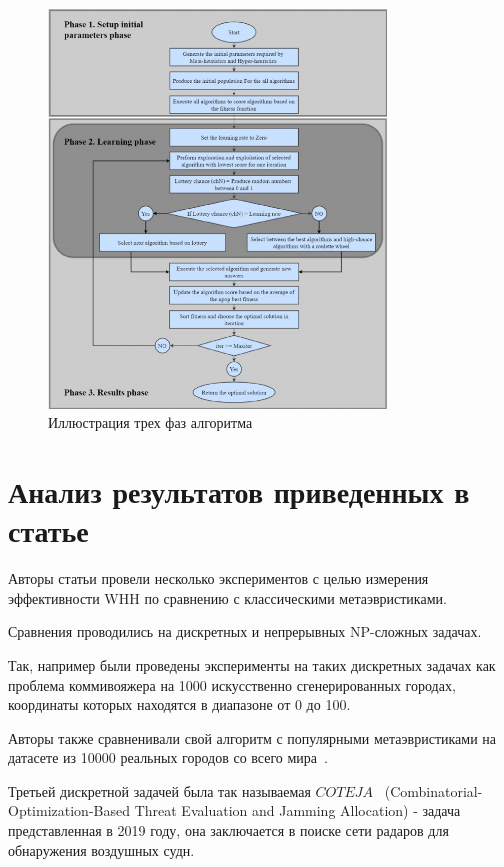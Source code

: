 \documentclass[a4paper,12pt]{extarticle}
\begin{document}
\begin{figure}
	\centering
	\includegraphics[width=0.8\textwidth]{complex_whh.png}
	\caption{Иллюстрация трех фаз алгоритма}
	\label{fig:complex_whh}
\end{figure}

\section{Анализ результатов приведенных в статье}

Авторы статьи провели несколько экспериментов с целью измерения эффективности WHH по сравнению с классическими метаэвристиками.

Сравнения проводились на дискретных и непрерывных NP-сложных задачах.

Так, например были проведены эксперименты на таких дискретных задачах как проблема коммивояжера на 1000 искусственно сгенерированных городах, координаты которых находятся в диапазоне от 0 до 100.

Авторы также сравненивали свой алгоритм с популярными метаэвристиками на датасете из 10000 реальных городов со всего мира~\cite{RWTCP}.

Третьей дискретной задачей была так называемая $COTEJA$~\cite{COTEJA} (Combinatorial-Optimization-Based Threat Evaluation and Jamming Allocation) - задача представленная в 2019 году, она заключается в поиске сети радаров для обнаружения воздушных судн.
\end{document}
